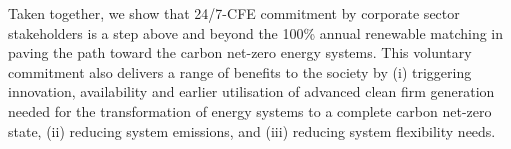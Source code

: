 Taken together, we show that 24/7-CFE commitment by corporate sector stakeholders is a step above and beyond the 100\% annual renewable matching in paving the path toward the carbon net-zero energy systems. 
This voluntary commitment also delivers a range of benefits to the society by 
(i) triggering innovation, availability and earlier utilisation of advanced clean firm generation needed for the transformation of energy systems to a complete carbon net-zero state, 
(ii) reducing system emissions, and (iii) reducing system flexibility needs.
